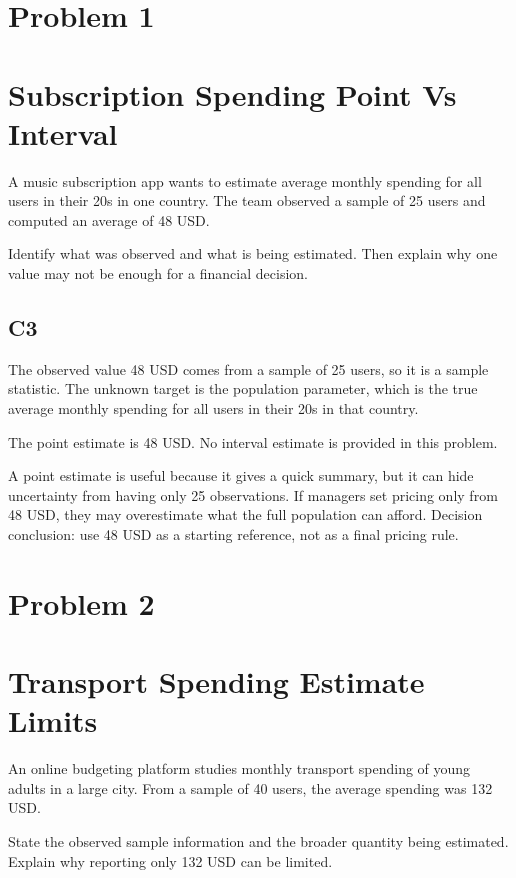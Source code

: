 	\begin{ExamProblems}
		\item
		\section{Problem 1}
		\section{Subscription Spending Point Vs Interval}
		A music subscription app wants to estimate average monthly spending for all users in their 20s in one country.
		The team observed a sample of 25 users and computed an average of 48 USD.

		Identify what was observed and what is being estimated.
		Then explain why one value may not be enough for a financial decision.

		\subsection*{C3}
		The observed value 48 USD comes from a sample of 25 users, so it is a sample statistic.
		The unknown target is the population parameter, which is the true average monthly spending for all users in their 20s in that country.

		The point estimate is 48 USD.
		No interval estimate is provided in this problem.

		A point estimate is useful because it gives a quick summary, but it can hide uncertainty from having only 25 observations.
		If managers set pricing only from 48 USD, they may overestimate what the full population can afford.
		Decision conclusion: use 48 USD as a starting reference, not as a final pricing rule.

		\newpage
		\item
		\section{Problem 2}
		\section{Transport Spending Estimate Limits}
		An online budgeting platform studies monthly transport spending of young adults in a large city.
		From a sample of 40 users, the average spending was 132 USD.

		State the observed sample information and the broader quantity being estimated.
		Explain why reporting only 132 USD can be limited.


\end{ExamProblems}
